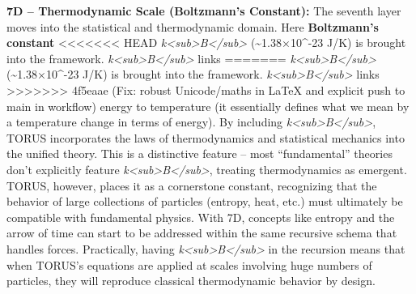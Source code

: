 \documentclass[]{article}
\begin{document}
\textbf{7D -- Thermodynamic Scale (Boltzmann's Constant):} The seventh
layer moves into the statistical and thermodynamic domain. Here
\textbf{Boltzmann's constant}
<<<<<<< HEAD
\emph{k\textless sub\textgreater B\textless/sub\textgreater{}}
(\textasciitilde1.38×10\^{}-23 J/K) is brought into the framework.
\emph{k\textless sub\textgreater B\textless/sub\textgreater{}} links
=======
\emph{k\textless{}sub\textgreater{}B\textless{}/sub\textgreater{}}
(\textasciitilde{}1.38×10\^{}-23 J/K) is brought into the framework.
\emph{k\textless{}sub\textgreater{}B\textless{}/sub\textgreater{}} links
>>>>>>> 4f5eaae (Fix: robust Unicode/maths in LaTeX and explicit push to main in workflow)
energy to temperature (it essentially defines what we mean by a
temperature change in terms of energy). By including
\emph{k\textless{}sub\textgreater{}B\textless{}/sub\textgreater{}},
TORUS incorporates the laws of thermodynamics and statistical mechanics
into the unified theory. This is a distinctive feature -- most
``fundamental'' theories don't explicitly feature
\emph{k\textless{}sub\textgreater{}B\textless{}/sub\textgreater{}},
treating thermodynamics as emergent. TORUS, however, places it as a
cornerstone constant, recognizing that the behavior of large collections
of particles (entropy, heat, etc.) must ultimately be compatible with
fundamental physics. With 7D, concepts like entropy and the arrow of
time can start to be addressed within the same recursive schema that
handles forces. Practically, having
\emph{k\textless{}sub\textgreater{}B\textless{}/sub\textgreater{}} in
the recursion means that when TORUS's equations are applied at scales
involving huge numbers of particles, they will reproduce classical
thermodynamic behavior by design.
\end{document}
